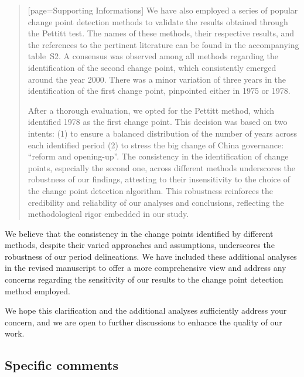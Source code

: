 \begin{quote}[page=Supporting Informations]
	We have also employed a series of popular change point detection methods to validate the results obtained through the Pettitt test. The names of these methods, their respective results, and the references to the pertinent literature can be found in the accompanying table~S2. A consensus was observed among all methods regarding the identification of the second change point, which consistently emerged around the year 2000. There was a minor variation of three years in the identification of the first change point, pinpointed either in 1975 or 1978.

	After a thorough evaluation, we opted for the Pettitt method, which identified 1978 as the first change point. This decision was based on two intents: (1) to ensure a balanced distribution of the number of years across each identified period (2) to stress the big change of China governance: ``reform and opening-up''. The consistency in the identification of change points, especially the second one, across different methods underscores the robustness of our findings, attesting to their insensitivity to the choice of the change point detection algorithm. This robustness reinforces the credibility and reliability of our analyses and conclusions, reflecting the methodological rigor embedded in our study.
\end{quote}

\AR*{} We believe that the consistency in the change points identified by different methods, despite their varied approaches and assumptions, underscores the robustness of our period delineations. We have included these additional analyses in the revised manuscript to offer a more comprehensive view and address any concerns regarding the sensitivity of our results to the change point detection method employed.

\AR*{} We hope this clarification and the additional analyses sufficiently address your concern, and we are open to further discussions to enhance the quality of our work.

\subsection*{Specific comments}

